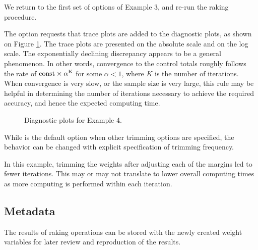 \begin{stexample}[Example 4]

We return to the first set of options of Example 3, and
re-run the raking procedure.

\begin{stlog}
\nullskip
\end{stlog}

The option  requests that trace plots are added to
the diagnostic plots, as shown on Figure \ref{fig:example4:sometimes}.
The trace plots are presented on the absolute scale and on the log scale.
The exponentially declining discrepancy appears to be a general phenomenon.
In other words, convergence to the control totals roughly follows
the rate of $\rm{const} \times \alpha^K$ for some $\alpha<1$, where $K$ is
the number of iterations. When convergence is very slow, or the sample
size is very large, this rule may be helpful in determining the number
of iterations necessary to achieve the required accuracy, and hence
the expected computing time.

\begin{figure}[h!]
\begin{center}
\end{center}
\caption{Diagnostic plots for Example 4.}
\label{fig:example4:sometimes}
\end{figure}

While  is the default option when
other trimming options are specified, the behavior can be changed
with explicit specification of trimming frequency.

\begin{stlog}
\nullskip
\end{stlog}

In this example, trimming the weights after adjusting each of the margins
led to fewer iterations. This may or may not translate to lower overall
computing times as more computing is performed within each iteration.

\end{stexample}

\subsection{Metadata}
\label{subsec:example:meta}

The results of raking operations can be stored with the newly created
weight variables for later review and reproduction of the results.

